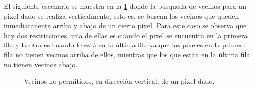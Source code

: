 \begin{enumerate}
\begin{solution}
        El siguiente escenario se muestra en la \cref{fig:vecinos_vertical} donde la búsqueda de vecinos para un pixel dado se realiza verticalmente, esto es, se buscan los vecinos que queden inmediatanente arriba y abajo de un cierto pixel. Para este caso se observa que hay dos restricciones, una de ellas es cuando el pixel se encuentra en la primera fila y la otra es cuando lo está en la última fila ya que los pixeles en la primera fila no tienen vecinos arriba de ellos, mientras que los que están en la última fila no tienen vecinos abajo.
        \begin{figure}[ht!]
            \centering
            \caption{Vecinos no permitidos, en dirección vertical, de un pixel dado.}
            \label{fig:vecinos_vertical}
        \end{figure}


\end{solution}
\end{enumerate}
